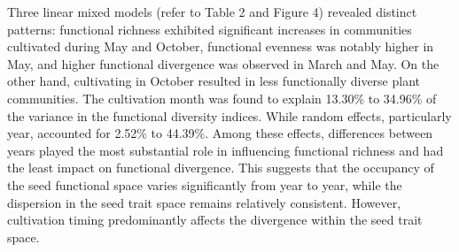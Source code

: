 \documentclass[a4paper, 11, margin=2cm]{article}
\begin{document}
    Three linear mixed models (refer to Table 2 and Figure 4) revealed distinct patterns: functional richness exhibited significant increases in communities cultivated during May and October, functional evenness was notably higher in May, and higher functional divergence was observed in March and May. On the other hand, cultivating in October resulted in less functionally diverse plant communities. The cultivation month was found to explain 13.30\% to 34.96\% of the variance in the functional diversity indices. While random effects, particularly year, accounted for 2.52\% to 44.39\%. Among these effects, differences between years played the most substantial role in influencing functional richness and had the least impact on functional divergence. This suggests that the occupancy of the seed functional space varies significantly from year to year, while the dispersion in the seed trait space remains relatively consistent. However, cultivation timing predominantly affects the divergence within the seed trait space.
\end{document}
